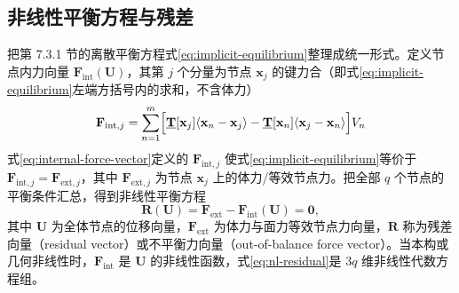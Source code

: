\subsection{非线性平衡方程与残差}\label{sec:nl-residual}

把第 7.3.1 节的离散平衡方程式\eqref{eq:implicit-equilibrium}整理成统一形式。定义节点内力向量 $\mathbf{F}_{\mathrm{int}}(\mathbf{U})$，其第 $j$ 个分量为节点 $\mathbf{x}_j$ 的键力合（即式\eqref{eq:implicit-equilibrium}左端方括号内的求和，不含体力）
\begin{equation}
  \mathbf{F}_{\mathrm{int},j}=\sum_{n=1}^{m}\Bigl[
    \underline{\mathbf{T}}[\mathbf{x}_j]\langle\mathbf{x}_n-\mathbf{x}_j\rangle
    -\underline{\mathbf{T}}[\mathbf{x}_n]\langle\mathbf{x}_j-\mathbf{x}_n\rangle
  \Bigr]V_n
  \label{eq:internal-force-vector}
\end{equation}
式\eqref{eq:internal-force-vector}定义的 $\mathbf{F}_{\mathrm{int},j}$ 使式\eqref{eq:implicit-equilibrium}等价于 $\mathbf{F}_{\mathrm{int},j}=\mathbf{F}_{\mathrm{ext},j}$，其中 $\mathbf{F}_{\mathrm{ext},j}$ 为节点 $\mathbf{x}_j$ 上的体力/等效节点力。把全部 $q$ 个节点的平衡条件汇总，得到非线性平衡方程
\begin{equation}
  \mathbf{R}(\mathbf{U})=\mathbf{F}_{\mathrm{ext}}-\mathbf{F}_{\mathrm{int}}(\mathbf{U})=\mathbf{0},
  \label{eq:nl-residual}
\end{equation}
其中 $\mathbf{U}$ 为全体节点的位移向量，$\mathbf{F}_{\mathrm{ext}}$ 为体力与面力等效节点力向量，$\mathbf{R}$ 称为残差向量（residual vector）或不平衡力向量（out-of-balance force vector）\cite{Littlewood2015,Hashim2020}。当本构或几何非线性时，$\mathbf{F}_{\mathrm{int}}$ 是 $\mathbf{U}$ 的非线性函数，式\eqref{eq:nl-residual}是 $3q$ 维非线性代数方程组。

